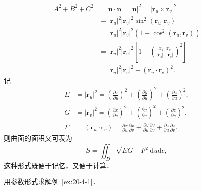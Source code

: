 \[
\begin{aligned}
A^{2}+B^{2}+C^{2}&=\bm{n}\cdot\bm{n}=\left|\bm{n}\right|^{2}=\left|\bm{r}_{u}\times\bm{r}_{v}\right|^{2}\\
&=\left|\bm{r}_{u}\right|^{2}\left|\bm{r}_{v}\right|^{2}\sin^{2}(\bm{r}_{u},\bm{r}_{v})\\
&=\left|\bm{r}_{u}\right|^{2}\left|\bm{r}_{v}\right|^{2}\left(1-\cos^{2}(\bm{r}_{u},\bm{r}_{v})\right)\\
&=\left|\bm{r}_{u}\right|^{2}\left|\bm{r}_{v}\right|^{2}\left[1-\left(\frac{\bm{r}_{u}\cdot\bm{r}_{v}}{\left|\bm{r}_{u}\right|\cdot\left|\bm{r}_{v}\right|}\right)^{2}\right]\\
&=\left|\bm{r}_{u}\right|^{2}\left|\bm{r}_{v}\right|^{2}-\left(\bm{r}_{u}\cdot\bm{r}_{v}\right)^{2}.
\end{aligned}
\]
记
\[
\begin{aligned}
E&=\left|\bm{r}_{u}\right|^{2}=\left(\frac{\partial x}{\partial u}\right)^{2}+\left(\frac{\partial y}{\partial u}\right)^{2}+\left(\frac{\partial z}{\partial u}\right)^{2},\\
G&=\left|\bm{r}_{v}\right|^{2}=\left(\frac{\partial x}{\partial v}\right)^{2}+\left(\frac{\partial y}{\partial v}\right)^{2}+\left(\frac{\partial z}{\partial v}\right)^{2},\\
F&=\left(\bm{r}_{u}\cdot\bm{r}_{v}\right)=\frac{\partial x}{\partial u}\frac{\partial x}{\partial v}+\frac{\partial y}{\partial u}\frac{\partial y}{\partial v}+\frac{\partial z}{\partial u}\frac{\partial z}{\partial v}.
\end{aligned}
\]
则曲面的面积又可表为
\[
S=\iint_{D}\sqrt{EG-F^{2}}\,\mathrm{d}u\mathrm{d}v,
\]
这种形式既便于记忆，又便于计算．

\begin{example}\label{ex:20-4-2}
用参数形式求解例~\ref{ex:20-4-1}．
\end{example}

